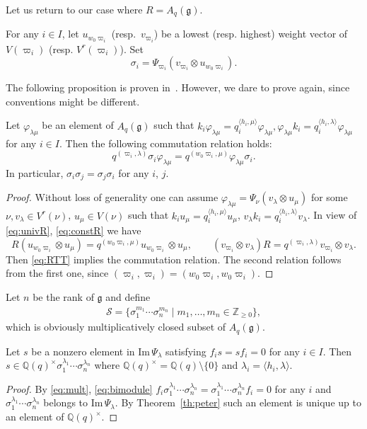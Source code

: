\documentclass[pdftex]{sigma}
\newcommand{\geh}{\mathfrak{g}}
\newcommand{\la}{\lambda}
\newcommand{\ot}{\otimes}
\newcommand{\pair}[1]{\langle{#1}\rangle}
\newcommand{\Z}{{\mathbb Z}}
\newcommand{\Q}{{\mathbb Q}}
\begin{document}
Let us return to our case where $R=A_q(\geh)$.
%
\begin{definition}\label{def:sigma}
For any $i \in I$, let $u_{w_0\varpi_i}$ (resp.~$v_{\varpi_i}$) be a lowest (resp. highest) weight vector
of $V(\varpi_i)$ (resp. $V^r(\varpi_i)$). Set
\[
\sigma_i=\Psi_{\varpi_i}(v_{\varpi_i}\ot u_{w_0\varpi_i}).
\]
\end{definition}

The following proposition is proven in~\cite{Joseph}. However, we dare to prove again, since conventions
might be dif\/ferent.

\begin{proposition} \label{pr:q-comm}
Let $\varphi_{\la\mu}$ be an element of $A_q(\geh)$ such that $k_i\varphi_{\la\mu}=
q_i^{\pair{h_i,\mu}}\varphi_{\la\mu},\varphi_{\la\mu}k_i=q_i^{\pair{h_i,\la}}\varphi_{\la\mu}$
for any $i \in I$. Then the following commutation relation holds:
\[
q^{(\varpi_i,\la)}\sigma_i\varphi_{\la\mu}=q^{(w_0\varpi_i,\mu)}\varphi_{\la\mu}\sigma_i.
\]
In particular, $\sigma_i\sigma_j=\sigma_j\sigma_i$ for any $i$, $j$.
\end{proposition}

\begin{proof}
Without loss of generality one can assume $\varphi_{\la\mu}=\Psi_\nu(v_\la\ot u_\mu)$ for some
$\nu,v_\la\in V^r(\nu)$, $u_\mu\in V(\nu)$ such that $k_iu_\mu=q_i^{\pair{h_i,\mu}}u_\mu$,
$v_\la k_i=q_i^{\pair{h_i,\la}}v_\la$. In view of \eqref{eq:univR}, \eqref{eq:constR} we have
\[
R(u_{w_0\varpi_i}\ot u_\mu)=q^{(w_0\varpi_i,\mu)}u_{w_0\varpi_i}\ot u_\mu,\qquad
(v_{\varpi_i}\ot v_\la)R=q^{(\varpi_i,\la)}v_{\varpi_i}\ot v_\la.
\]
Then \eqref{eq:RTT} implies the commutation relation.
The second relation follows from the f\/irst one, since $(\varpi_i,\varpi_i)
=(w_0\varpi_i,w_0\varpi_i)$.
\end{proof}

Let $n$ be the rank of $\geh$ and def\/ine
\begin{gather*}
\mathcal{S}=\big\{\sigma_1^{m_1}\cdots\sigma_n^{m_n}\mid m_1,\ldots,m_n\in\Z_{\ge0}\big\},
\end{gather*}
which is obviously multiplicatively closed subset of $A_q(\geh)$.

\begin{lemma}\label{le:ff}
Let $s$ be a nonzero element in $\mathrm{Im}\,\Psi_\la$
satisfying $f_is=sf_i=0$ for any $i \in I$.
Then $s\in\Q(q)^\times\sigma_1^{\la_1}\cdots\sigma_n^{\la_n}$
where $\Q(q)^\times=\Q(q)\setminus\{0\}$ and
$\la_i=\pair{h_i,\la}$.
\end{lemma}
%
\begin{proof}
By \eqref{eq:mult}, \eqref{eq:bimodule} $f_i\sigma_1^{\la_1}\cdots\sigma_n^{\la_n}
=\sigma_1^{\la_1}\cdots\sigma_n^{\la_n}f_i=0$ for any $i$ and $\sigma_1^{\la_1}\cdots\sigma_n^{\la_n}$
belongs to $\mathrm{Im}\,\Psi_\la$. By Theorem~\ref{th:peter} such an element is unique up to an element
of $\Q(q)^\times$.
\end{proof}
\end{document}
